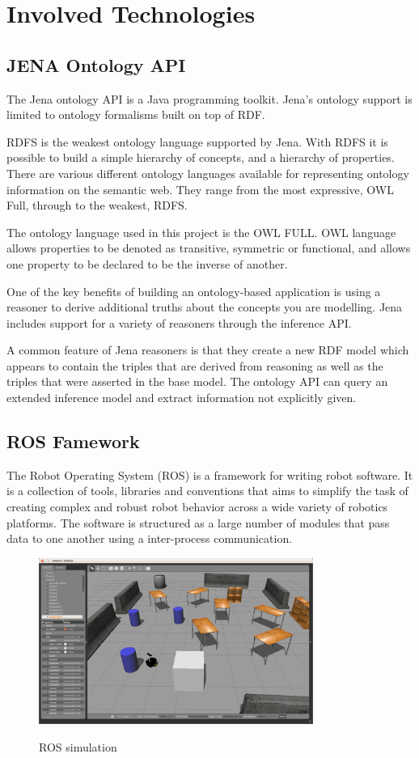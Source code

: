 
\section{Involved Technologies}

\subsection{JENA Ontology API}
The Jena ontology API is a Java programming toolkit. Jena's ontology support is limited to ontology formalisms built on top of RDF.

RDFS is the weakest ontology language supported by Jena. With RDFS it is possible to build a simple hierarchy of concepts, and a hierarchy of properties. 
There are various different ontology languages available for representing ontology information on the semantic web. They range from the most expressive, OWL Full, through to the weakest, RDFS.

The ontology language used in this project is the OWL FULL. OWL language allows properties to be denoted as transitive, symmetric or functional, and allows one property to be declared to be the inverse of another.

One of the key benefits of building an ontology-based application is using a reasoner to derive additional truths about the concepts you are modelling. Jena includes support for a variety of reasoners through the inference API.

A common feature of Jena reasoners is that they create a new RDF model which appears to contain the triples that are derived from reasoning as well as the triples that were asserted in the base model. The ontology API can query an extended inference model and extract information not explicitly given.

\subsection{ROS Famework}
The Robot Operating System (ROS) is a framework  for writing robot software. It is a collection of tools, libraries and conventions that aims to simplify the task of creating complex and robust robot behavior across a wide variety of robotics platforms. The software is structured as a large number of modules that pass data to one another using a inter-process communication.
\\
\begin{figure}[H]
\centering
\includegraphics[width=0.8\textwidth]{imgs/gazebo1.png}
\label{fig:gazebo1}
\caption{ROS simulation}
\end{figure}

